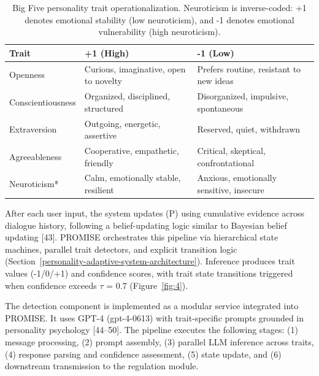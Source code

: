 \begin{longtable}[]{@{}
  >{\raggedright\arraybackslash}p{}
  >{\raggedright\arraybackslash}p{}
  >{\raggedright\arraybackslash}p{}@{}}
\caption{Big Five personality trait operationalization. Neuroticism is inverse-coded: +1 denotes emotional stability (low neuroticism), and -1 denotes emotional vulnerability (high neuroticism).}\label{tab:1}\\
\toprule\noalign{}
\begin{minipage}[b]{\linewidth}\raggedright
Trait
\end{minipage} & \begin{minipage}[b]{\linewidth}\raggedright
+1 (High)
\end{minipage} & \begin{minipage}[b]{\linewidth}\raggedright
-1 (Low)
\end{minipage} \\
\midrule\noalign{}
\endhead
\bottomrule\noalign{}
\endlastfoot
Openness & Curious, imaginative, open to novelty & Prefers routine, resistant to new ideas \\
Conscientiousness & Organized, disciplined, structured & Disorganized, impulsive, spontaneous \\
Extraversion & Outgoing, energetic, assertive & Reserved, quiet, withdrawn \\
Agreeableness & Cooperative, empathetic, friendly & Critical, skeptical, confrontational \\
Neuroticism* & Calm, emotionally stable, resilient & Anxious, emotionally sensitive, insecure \\
\end{longtable}

After each user input, the system updates (P) using cumulative evidence across dialogue history, following a belief-updating logic similar to Bayesian belief updating {[}43{]}. PROMISE orchestrates this pipeline via hierarchical state machines, parallel trait detectors, and explicit transition logic (Section~\ref{personality-adaptive-system-architecture}). Inference produces trait values (-1/0/+1) and confidence scores, with trait state transitions triggered when confidence exceeds $\tau$ = 0.7 (Figure~\ref{fig:4}).



The detection component is implemented as a modular service integrated into PROMISE. It uses GPT-4 (gpt-4-0613) with trait-specific prompts grounded in personality psychology {[}44--50{]}. The pipeline executes the following stages: (1) message processing, (2) prompt assembly, (3) parallel LLM inference across traits, (4) response parsing and confidence assessment, (5) state update, and (6) downstream transmission to the regulation module.

